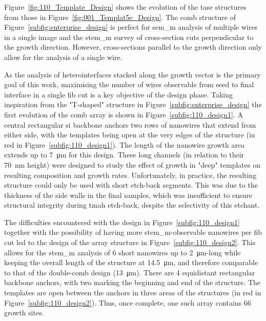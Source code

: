 Figure~\ref{fig:110_Template_Design} shows the evolution of the \acs{tase} structures from those in Figure~\ref{fig:001_Templat5e_Design}. The comb structure of Figure~\ref{subfig:enterprise_design} is perfect for \acf{sem_m} analysis of multiple wires in a single image and the \acf{stem_m} survey of cross-section cuts perpendicular to the growth direction. However, cross-sections parallel to the growth direction only allow for the analysis of a single wire.
\par
As the analysis of heterointerfaces stacked along the growth vector is the primary goal of this work, maximising the number of wires observable from seed to final interface in a single \acf{fib} cut is a key objective of the design phase. Taking inspiration from the "T-shaped" structure in Figure~\ref{subfig:enterprise_design} the first evolution of the comb array is shown in Figure~\ref{subfig:110_design1}. A central rectangular \acs{si} backbone anchors two rows of nanowires that extend from either side, with the templates being open at the very edges of the structure (in red in Figure~\ref{subfig:110_design1}). The length of the nanowire growth area extends up to \qty{7}{\micro\metre} for this design. These long channels (in relation to their \qty{70}{\nano\metre} height) were designed to study the effect of growth in "deep" templates on resulting composition and growth rates. Unfortunately, in practice, the resulting structure could only be used with short etch-back segments. This was due to the thickness of the side walls in the final samples, which was insufficient to ensure structural integrity during \acs{tmah} etch-back, despite the selectivity of this etchant.
\par
The difficulties encountered with the design in Figure~\ref{subfig:110_design1} together with the possibility of having more \acs{stem_m}-observable nanowires per \acs{fib} cut led to the design of the array structure in Figure~\ref{subfig:110_design2}. This allows for the \acs{stem_m} analysis of \num{6} short nanowires up to \qty{2}{\micro\metre}-long while keeping the overall length of the structure at \qty{14.5}{\micro\metre}, and therefore comparable to that of the double-comb design (\qty{13}{\micro\metre}). There are \num{4} equidistant rectangular backbone anchors, with two marking the beginning and end of the structure. The templates are open between the anchors in three areas of the structures (in red in Figure~\ref{subfig:110_design2}). Thus, once complete, one such array contains \num{66} growth sites.

